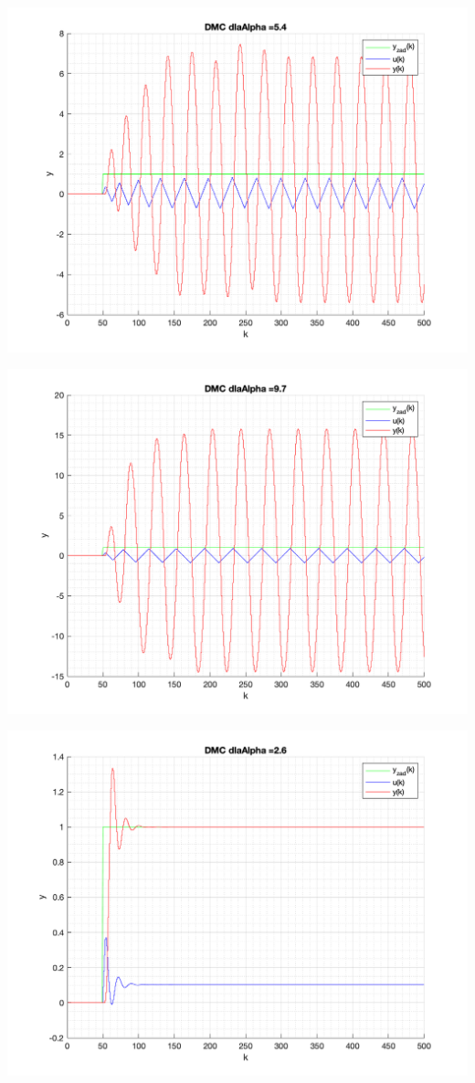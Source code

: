 \documentclass[a4paper, 11pt]{article}
\begin{document}
\begin{enumerate}
 \includegraphics[width=\linewidth]{./ModelsDodatkowe_Alpha/P4_DMC_Alpha_5_4_png.png} 
 
 \includegraphics[width=\linewidth]{./ModelsDodatkowe_Alpha/P4_DMC_Alpha_9_7_png.png} 
 
 \includegraphics[width=\linewidth]{./ModelsDodatkowe_Alpha/P4_DMC_Alpha_2_6_png.png} 
 

\end{enumerate}
\end{document}
